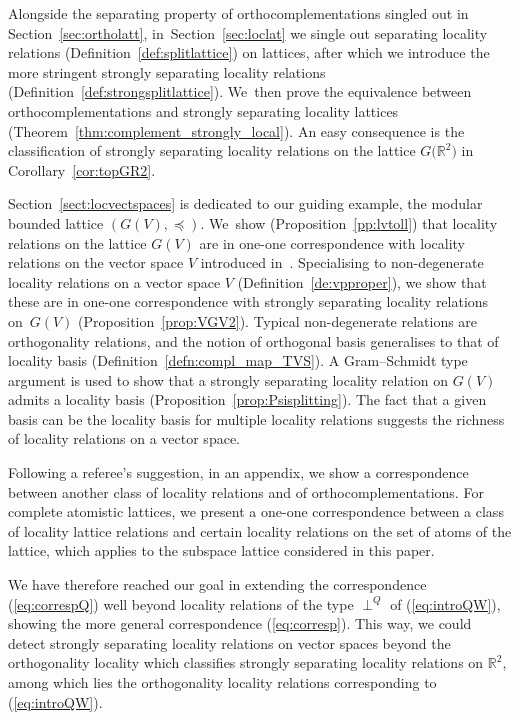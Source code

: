 \documentclass[pdftex]{sigma}
\numberwithin{equation}{section}
\newcommand{\R}{\mathbb{R}}
\newcommand{\loc}{locality\xspace}
\newcommand{\pone}{separating\xspace }
\begin{document}
Alongside the separating property of orthocomplementations singled out in Section~\ref{sec:ortholatt}, in~Sec\-tion~\ref{sec:loclat} we single out separating locality relations (Definition~\ref{def:splitlattice}) on lattices, after which we introduce the more stringent strongly separating locality relations (Definition~\ref{def:strongsplitlattice}). We~then prove the equivalence between orthocomplementations and strongly separating locality lattices (Theorem~\ref{thm:complement_strongly_local}). An easy consequence is the classification of strongly separating locality relations on the lattice $G\big(\R^2\big)$ in Corollary~\ref{cor:topGR2}.

Section~\ref{sect:locvectspaces} is dedicated to our guiding example, the modular bounded lattice $(G(V), \preceq)$. We~show (Proposition~\ref{pp:lvtoll}) that locality relations on the lattice $G(V)$ are in one-one correspondence with locality relations on the vector space $V$ introduced in~\cite{CGPZ1}.
	Specialising to non-degenerate locality relations on a vector space $V$ (Definition~\ref{de:vpproper}), we show that these are in one-one correspondence with strongly separating locality relations on~$G(V)$ (Proposition~\ref{prop:VGV2}). Typical non-degenerate relations are orthogonality relations, and the notion of orthogonal basis generalises to that of locality basis (Definition~\ref{defn:compl_map_TVS}). A Gram--Schmidt type argument is used to show that a strongly \pone \loc relation on $G(V)$ admits a \loc basis (Proposition~\ref{prop:Psisplitting}). The fact that a given basis can be the \loc basis for multiple \loc relations suggests the richness of locality relations on a vector space.
	

	Following a referee's suggestion, in an appendix, we show a correspondence between another class of locality relations and of orthocomplementations. For complete atomistic lattices, we present a one-one correspondence between a class of locality lattice relations and certain locality relations on the set of atoms of the lattice, which applies to the subspace lattice considered in this paper.

We have therefore reached our goal in extending the correspondence (\ref{eq:correspQ}) well beyond loca\-lity relations of the type $\perp^Q$
of (\ref{eq:introQW}), showing the more general correspondence (\ref{eq:corresp}).
This way, we could detect strongly
\pone \loc relations on vector spaces beyond the ortho\-go\-na\-lity \loc which classifies strongly \pone \loc relations on $\R^2$, among which lies the orthogonality \loc relations corresponding to
(\ref{eq:introQW}).
\end{document}
